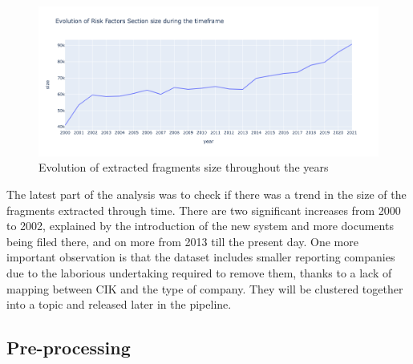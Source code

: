 \documentclass[12pt,MSc,a4paper,oneside]{muthesis}
\begin{document}
\begin{figure}[h]
  \centering
  \includegraphics[scale=0.5]{dataset_analysis/Evolution of size .png}
  \caption{Evolution of extracted fragments size throughout the years}
\end{figure}

The latest part of the analysis was to check if there was a trend in the size of the fragments extracted through time. There are two significant increases from 2000 to 2002, explained by the introduction of the new system and more documents being filed there, and on more from 2013 till the present day. One more important observation is that the dataset includes smaller reporting companies due to the laborious undertaking required to remove them, thanks to a lack of mapping between CIK and the type of company. They will be clustered together into a topic and released later in the pipeline.

\subsection{Pre-processing}
\end{document}
